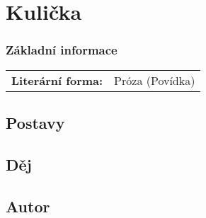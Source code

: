 \section{Kulička}
\subsubsection{Základní informace}
\begin{center}
    \begin{tabular}{ c|c }
        \textbf{Literární forma:} & Próza (Povídka)\\
    \end{tabular}
\end{center}
\subsection{Postavy}
\subsection{Děj}
\subsection{Autor}